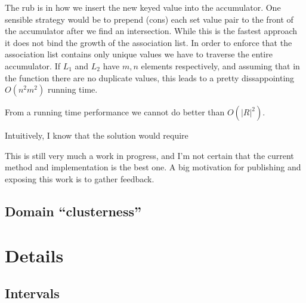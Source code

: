 \documentclass{article}
\begin{document}
The rub is in how we insert the new keyed value into the accumulator.
One sensible strategy would be to prepend (cons) each set value pair to the
front of the accumulator after we find an intersection.
While this is the fastest approach it does not bind the growth of the
association list.
In order to enforce that the association list contains only unique values
we have to traverse the entire accumulator.
If $L_{1}$ and $L_{2}$ have $m, n$ elements respectively,
and assuming that in the function there are no duplicate values,
this leads to a pretty dissappointing $O(n^{2}m^{2})$ running time.

From a running time performance we cannot do better than $O(|R|^{2})$.


Intuitively, I know that the solution would require 

\begin{comment}
\begin{center}
\begin{tabular}{|l|r|r|}
  \hline
  Data Structure    & Storage  & Merge Cost \\
  \hline
  \hline
  Array                           & $O(|D|)$ & $O(|D|)$    \\
  \hline
  Naive association list          & $O(|D|)$ & $O(|D|)$    \\
  Value indexed association list  & $(|R|)$  & $O(  $\\
  \hline
\end{tabular}
\end{center}

\end{comment}





This is still very much a work in progress,
and I'm not certain that the current method and implementation is the best one.
A big motivation for publishing and exposing this work is to gather feedback.

\subsection{Domain ``clusterness''}

\section{Details}

\subsection{Intervals}
\end{document}

